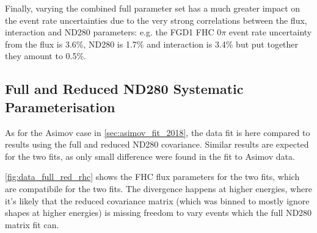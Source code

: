 Finally, varying the combined full parameter set has a much greater impact on the event rate uncertainties due to the very strong correlations between the flux, interaction and ND280 parameters: e.g. the FGD1 FHC 0$\pi$ event rate uncertainty from the flux is 3.6\%, ND280 is 1.7\% and interaction is 3.4\% but put together they amount to 0.5\%.

\subsection{Full and Reduced ND280 Systematic Parameterisation}
As for the Asimov case in \autoref{sec:asimov_fit_2018}, the data fit is here compared to results using the full and reduced ND280 covariance. Similar results are expected for the two fits, as only small difference were found in the fit to Asimov data.

\autoref{fig:data_full_red_rhc} shows the FHC flux parameters for the two fits, which are compatibile for the two fits. The divergence happens at higher energies, where it's likely that the reduced covariance matrix (which was binned to mostly ignore shapes at higher energies) is missing freedom to vary events which the full ND280 matrix fit can.

